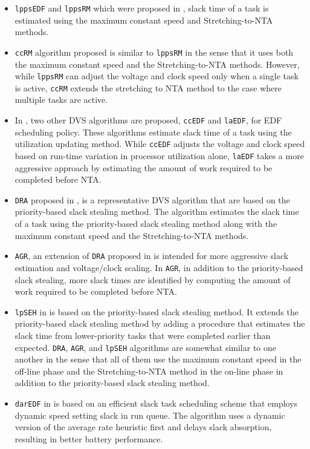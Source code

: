 \documentclass[10pt,article]{IEEEtran}
\begin{document}
\begin{itemize}

    \item \texttt{lppsEDF} and \texttt{lppsRM} which were proposed in \cite{shin}, slack time of a task is estimated using the maximum constant speed and Stretching-to-NTA methods.
    
    \item \texttt{ccRM} algorithm proposed \cite{pillai} is similar to \texttt{lppsRM} in the sense that it uses both the maximum constant speed and the Stretching-to-NTA methods. However, while \texttt{lppsRM} can adjust the voltage and clock speed only when a single task is active, \texttt{ccRM} extends the stretching to NTA method to the case where multiple tasks are active.

    
    \item In \cite{pillai}, two other DVS algorithms are proposed, \texttt{ccEDF} and \texttt{laEDF}, for EDF scheduling policy. These algorithms estimate slack time of a task using the utilization updating method. While \texttt{ccEDF} adjusts the voltage and clock speed based on run-time variation in processor utilization alone, \texttt{laEDF} takes a more aggressive approach by estimating the amount of work required to be completed before NTA. 
    
    \item \texttt{DRA} proposed in \cite{aydin}, is a representative DVS algorithm that are based on the priority-based slack stealing method. The algorithm estimates the slack time of a task using the priority-based slack stealing method along with the maximum constant speed and the Stretching-to-NTA methods.
    
    \item \texttt{AGR}, an extension of \texttt{DRA} proposed in \cite{aydin} is intended for more aggressive slack estimation and voltage/clock scaling. In \texttt{AGR}, in addition to the priority-based slack stealing, more slack times are identified by computing the amount of work required to be completed before NTA.
    
    \item \texttt{lpSEH} in \cite{kim} is based on the priority-based slack stealing method. It extends the priority-based slack stealing method by adding a procedure that estimates the slack time from lower-priority tasks that were completed earlier than expected. \texttt{DRA}, \texttt{AGR}, and \texttt{lpSEH} algorithms are somewhat similar to one another in the sense that all of them use the maximum constant speed in the off-line phase and the Stretching-to-NTA method in the on-line phase in addition to the priority-based slack stealing method.
    
    \item \texttt{darEDF} in \cite{zhuo-chakrabarti} is based on an efficient slack task scheduling scheme that employs dynamic speed setting slack in run queue. The algorithm uses a dynamic version of the average rate heuristic first and delays slack absorption, resulting in better battery performance.    

\end{itemize}
\end{document}
